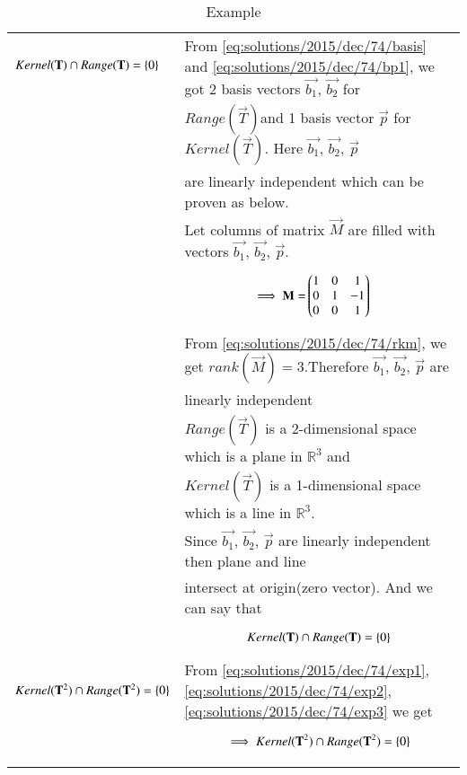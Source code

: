\begin{longtable}{|l|l|}
\hline
$Kernel(\mathbf{T})\cap Range(\mathbf{T})=\left\{0\right\}$&From \eqref{eq:solutions/2015/dec/74/basis} and \eqref{eq:solutions/2015/dec/74/bp1}, we got 2 basis vectors $\vec{b_1}$, $\vec{b_2}$ for \\&$Range(\vec{T})$and 1 basis vector $\vec{p}$ for $Kernel(\vec{T})$. Here $\vec{b_1}$, $\vec{b_2}$, $\vec{p}$\\&are linearly independent which can be proven as below.\\&Let columns of matrix $\vec{M}$ are filled with vectors $\vec{b_1}$, $\vec{b_2}$, $\vec{p}$.\\&\parbox{11cm}{\begin{align}
    \implies\mathbf{M}=&\begin{pmatrix}1&0&1\\0&1&-1\\0&0&1\end{pmatrix}\label{eq:solutions/2015/dec/74/rkm}
\end{align}}\\&From \eqref{eq:solutions/2015/dec/74/rkm}, we get $rank(\vec{M})=3$.Therefore $\vec{b_1}$, $\vec{b_2}$, $\vec{p}$ are\\&linearly independent\\&$Range(\vec{T})$ is a 2-dimensional space which is a plane in $\mathbb{R}^3$ and\\&$Kernel(\vec{T})$ is a 1-dimensional space which is a line in $\mathbb{R}^3$.\\&Since $\vec{b_1}$, $\vec{b_2}$, $\vec{p}$ are linearly independent then plane and line \\&intersect at origin(zero vector). And we can say that\\&\parbox{11cm}{\begin{align}
    Kernel(\mathbf{T})\cap Range(\mathbf{T})=\left\{0\right\}\label{eq:solutions/2015/dec/74/exp3}
\end{align}}\\
\hline
$Kernel(\mathbf{T}^2)\cap Range(\mathbf{T}^2)=\left\{0\right\}$&From \eqref{eq:solutions/2015/dec/74/exp1}, \eqref{eq:solutions/2015/dec/74/exp2}, \eqref{eq:solutions/2015/dec/74/exp3} we get\\&\parbox{11cm}{\begin{align}
    \implies Kernel(\mathbf{T}^2)\cap Range(\mathbf{T}^2)=\left\{0\right\}
\end{align}}\\
\hline
\caption{Example}
\label{eq:solutions/2015/dec/74/exp}
\end{longtable}
\twocolumn
